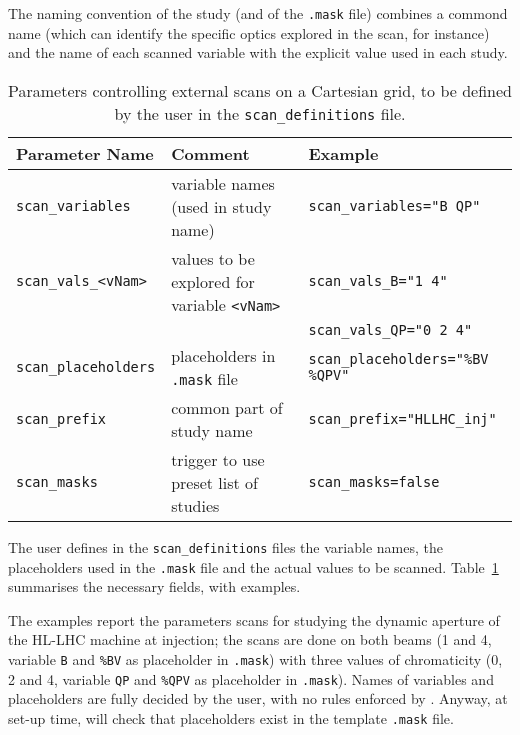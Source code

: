 The naming convention of the study (and of the \texttt{.mask} file)
combines a commond name (which can identify the specific optics explored in
the scan, for instance) and the name of each scanned variable
with the explicit value used in each study.

\begin{table}[h]
\begin{center}
  \caption{Parameters controlling external scans on a Cartesian
    grid, to be defined by the user in the \texttt{scan\_definitions} file.}
    \label{tab:ExternalScanParametersCartesian}
    \begin{tabular}{|l|l|l|}
    \hline
    \rowcolor{blue!30}
    \textbf{Parameter Name} & \textbf{Comment} & \textbf{Example} \\
    \hline
    \texttt{scan\_variables} & variable names (used in study name) &
       \texttt{scan\_variables="B QP"} \\
    \texttt{scan\_vals\_<vNam>} & values to be explored for variable \texttt{<vNam>} &
    \texttt{scan\_vals\_B="1 4"} \\
    & & \texttt{scan\_vals\_QP="0 2 4"} \\
    \texttt{scan\_placeholders} & placeholders in \texttt{.mask} file &
       \texttt{scan\_placeholders="\%BV  \%QPV"} \\
    \texttt{scan\_prefix} & common part of study name &
       \texttt{scan\_prefix="HLLHC\_inj"} \\
    \texttt{scan\_masks} & trigger to use preset list of studies &
       \texttt{scan\_masks=false} \\
    \hline
    \end{tabular}
\end{center}
\end{table}
The user defines in the \texttt{scan\_definitions} files the variable names,
the placeholders used in the \texttt{.mask} file and the actual values to be
scanned. Table~\ref{tab:ExternalScanParametersCartesian} summarises the necessary
fields, with examples.

The examples report the parameters scans for
studying the dynamic aperture of the HL-LHC machine at injection; the
scans are done on both beams (1 and 4, variable \texttt{B} and \texttt{\%BV}
as placeholder in \texttt{.mask}) with three values of chromaticity
(0, 2 and 4, variable \texttt{QP} and \texttt{\%QPV} as placeholder in
\texttt{.mask}). Names of variables and placeholders are fully decided by
the user, with no rules enforced by \SIXDESK{}. Anyway, at set-up time,
\SIXDESK{} will check that placeholders exist in the template
\texttt{.mask} file.

